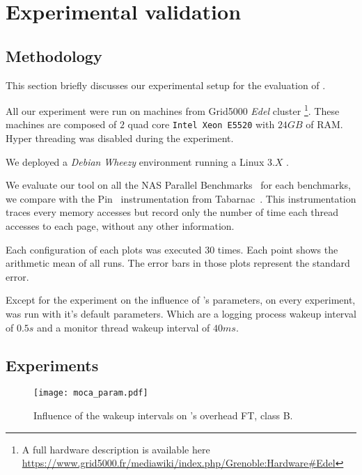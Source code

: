 \section{Experimental validation}
\label{sec:expe}

\subsection{Methodology}
\label{sec:exp-methodo}

This section briefly discusses our experimental setup for the evaluation of
\Moca.

All our experiment were run on  machines from Grid5000 \emph{Edel} cluster
\footnote{A full hardware description is available here
    \url{https://www.grid5000.fr/mediawiki/index.php/Grenoble:Hardware\#Edel}}.
    These machines are composed of $2$ quad core \texttt{Intel Xeon E5520} with
    $24 GB$ of RAM. Hyper threading was disabled during the experiment.

We deployed a \emph{Debian} \emph{Wheezy} environment running a Linux $3.X$
.

We evaluate our tool on all the NAS Parallel Benchmarks~\cite{Jin1999} for
each benchmarks, we compare \Moca with the Pin~\cite{Luk05Pin} instrumentation
from Tabarnac~\cite{Beniamine15TABARNACRR}. This instrumentation traces every
memory accesses but record only the number of time each thread accesses to
each page, without any other information.

Each configuration of each plots was executed $30$ times. Each point shows the
arithmetic mean of all runs. The error bars in those plots represent the
standard error.

Except for the experiment on the influence of \Moca's parameters, on every
experiment, \Moca was run with it's default parameters. Which are a logging
process wakeup interval of $0.5s$ and a monitor thread wakeup interval
of $40ms$.


\subsection{Experiments}
\label{sec:expe-ovh}

\begin{figure}[htb]
    \centering
    \texttt{[image: moca\_param.pdf]}
    \caption{Influence of the wakeup intervals on \Moca's overhead FT, class B.}
    \label{fig:param}
\end{figure}


